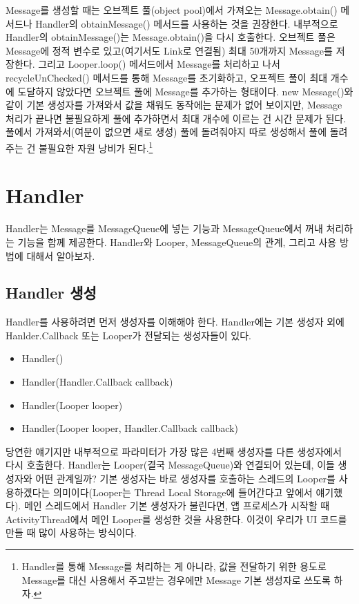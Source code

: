 Message를 생성할 때는 오브젝트 풀(object pool)에서 가져오는 Message.obtain() 메서드나 Handler의 obtainMessage() 메서드를 사용하는 것을 권장한다. 
내부적으로 Handler의 obtainMessage()는  Message.obtain()을 다시 호출한다.
오브젝트 풀은 Message에 정적 변수로 있고(여기서도 Link로 연결됨) 최대 50개까지 Message를 저장한다. 
그리고 Looper.loop() 메서드에서 Message를 처리하고 나서 recycleUnChecked() 메서드를 통해 Message를 초기화하고, 오프젝트 풀이 최대 개수에 도달하지 않았다면 오브젝트 풀에 Message를 추가하는 형태이다.
new Message()와 같이 기본 생성자를 가져와서 값을 채워도 동작에는 문제가 없어 보이지만, Message 처리가 끝나면 불필요하게 풀에 추가하면서 최대 개수에 이르는 건 시간 문제가 된다. 
풀에서 가져와서(여분이 없으면 새로 생성) 풀에 돌려줘야지 따로 생성해서 풀에 돌려주는 건 불필요한 자원 낭비가 된다.\footnote{Handler를 통해 Message를 처리하는 게 아니라, 값을 전달하기 위한 용도로 Message를 대신 사용해서 주고받는 경우에만 Message 기본 생성자로 쓰도록 하자.}


\section{Handler}
Handler는 Message를 MessageQueue에 넣는 기능과 MessageQueue에서 꺼내 처리하는 기능을 함께 제공한다. 
Handler와 Looper, MessageQueue의 관계, 그리고 사용 방법에 대해서 알아보자.

\subsection{Handler 생성}
Handler를 사용하려면 먼저 생성자를 이해해야 한다. 
Handler에는 기본 생성자 외에 Hanlder.Callback 또는 Looper가 전달되는 생성자들이 있다. 
\begin{itemize}
\item Handler()
\item Handler(Handler.Callback callback)
\item Handler(Looper looper)
\item Handler(Looper looper, Handler.Callback callback)
\end{itemize}
당연한 얘기지만 내부적으로 파라미터가 가장 많은 4번째 생성자를 다른 생성자에서 다시 호출한다.
Handler는 Looper(결국 MessageQueue)와 연결되어 있는데, 이들 생성자와 어떤 관계일까? 
기본 생성자는 바로 생성자를 호출하는 스레드의 Looper를 사용하겠다는 의미이다(Looper는 Thread Local Storage에 들어간다고 앞에서 얘기했다).
메인 스레드에서 Handler 기본 생성자가 불린다면, 앱 프로세스가 시작할 때 ActivityThread에서 메인 Looper를 생성한 것을 사용한다. 
이것이 우리가 UI 코드를 만들 때 많이 사용하는 방식이다.\\

